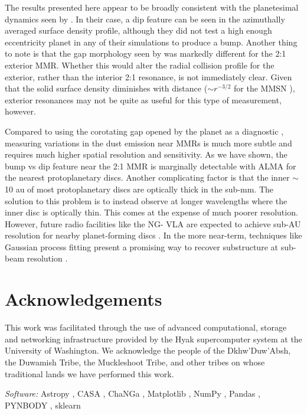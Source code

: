 \documentclass[fleqn,usenatbib]{mnras}
\begin{document}
The results presented here appear to be broadly consistent with the planetesimal dynamics seen by \citet{2016ApJ...818..159T}. In their case, a dip 
feature can be seen in the azimuthally averaged surface density profile, although they did not test a high enough eccentricity planet in any of their 
simulations to produce a bump. Another thing to note is that the gap morphology seen by \citet{2016ApJ...818..159T} was markedly different for the 
2:1 exterior MMR. Whether this would alter the radial collision profile for the exterior, rather than the interior 2:1 resonance, is not immediately clear.  
Given that the solid surface density diminishes with distance ($\sim r^{-3/2}$ for the MMSN \citep{1981PThPS..70...35H}), exterior resonances may 
not be quite as useful for this type of measurement, however.

Compared to using the corotating gap opened by the planet as a diagnostic \citep{2013ApJ...777L..31D, 2016ApJ...820...29D}, measuring 
variations in the dust emission near MMRs is much more subtle and requires much higher spatial resolution and sensitivity. As we have shown, the 
bump vs dip feature near the 2:1 MMR is marginally detectable with ALMA for the nearest protoplanetary discs. Another complicating factor is that 
the inner $\sim$ 10 au of most protoplanetary discs are optically thick in the sub-mm. The solution to this problem is to instead observe at longer 
wavelengths where the inner disc is optically thin. This comes at the expense of much poorer resolution. However, future radio facilities like the NG-
VLA are expected to achieve sub-AU resolution for nearby planet-forming discs \citep{2018ASPC..517..147R}. In the more near-term, techniques 
like Gaussian process fitting present a promising way to recover substructure at sub-beam resolution \citep{2020arXiv200507709J}.

\section*{Acknowledgements}
This work was facilitated through the use of advanced computational, storage and networking infrastructure provided by the Hyak supercomputer system at the 
University of Washington. We acknowledge the people of the Dkhw’Duw’Absh, the Duwamish Tribe, the Muckleshoot Tribe, and other tribes on whose traditional 
lands we have performed this work.

\textit{Software:} Astropy \citep{2013A&A...558A..33A}, {\sc CASA} \citep{2007ASPC..376..127M}, {\sc ChaNGa} \citep{2008IEEEpds...ChaNGa, 2015AphCom..2..1}, Matplotlib \citep{2007CSE.....9...90H}, NumPy \citep{2011CSE....13b..22V}, Pandas \citep{mckinney-proc-scipy-2010}, {\sc PYNBODY} \citep{2013ascl.soft05002P}, {\sc sklearn} \citep{scikit-learn}
\end{document}
